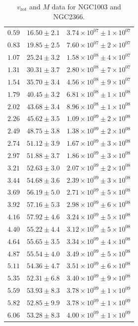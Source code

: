 \documentclass{article}
\newcommand\vrot{\ensuremath{v_{\textrm{rot}}}}
\begin{document}
\begin{table}[h!]
\begin{tabular}{|c|c|c|}
        $0.59$ & $16.50 \pm 2.1$ & $3.74\times 10^{07} \pm 1\times 10^{07}$ \\
        $0.83$ & $19.85 \pm 2.5$ & $7.60\times 10^{07} \pm 2\times 10^{07}$ \\
        $1.07$ & $25.24 \pm 3.2$ & $1.58\times 10^{08} \pm 4\times 10^{07}$ \\
        $1.31$ & $30.31 \pm 3.7$ & $2.80\times 10^{08} \pm 7\times 10^{07}$ \\
        $1.54$ & $35.70 \pm 3.4$ & $4.56\times 10^{08} \pm 9\times 10^{07}$ \\
        $1.79$ & $40.45 \pm 3.2$ & $6.81\times 10^{08} \pm 1\times 10^{08}$ \\
        $2.02$ & $43.68 \pm 3.4$ & $8.96\times 10^{08} \pm 1\times 10^{08}$ \\
        $2.26$ & $45.62 \pm 3.5$ & $1.09\times 10^{09} \pm 2\times 10^{08}$ \\
        $2.49$ & $48.75 \pm 3.8$ & $1.38\times 10^{09} \pm 2\times 10^{08}$ \\
        $2.74$ & $51.12 \pm 3.9$ & $1.67\times 10^{09} \pm 3\times 10^{08}$ \\
        $2.97$ & $51.88 \pm 3.7$ & $1.86\times 10^{09} \pm 3\times 10^{08}$ \\
        $3.21$ & $52.63 \pm 3.0$ & $2.07\times 10^{09} \pm 2\times 10^{08}$ \\
        $3.44$ & $54.68 \pm 3.6$ & $2.39\times 10^{09} \pm 3\times 10^{08}$ \\
        $3.69$ & $56.19 \pm 5.0$ & $2.71\times 10^{09} \pm 5\times 10^{08}$ \\
        $3.92$ & $57.16 \pm 5.3$ & $2.98\times 10^{09} \pm 6\times 10^{08}$ \\
        $4.16$ & $57.92 \pm 4.6$ & $3.24\times 10^{09} \pm 5\times 10^{08}$ \\
        $4.40$ & $55.22 \pm 4.4$ & $3.12\times 10^{09} \pm 5\times 10^{08}$ \\
        $4.64$ & $55.65 \pm 3.5$ & $3.34\times 10^{09} \pm 4\times 10^{08}$ \\
        $4.87$ & $55.54 \pm 4.0$ & $3.49\times 10^{09} \pm 5\times 10^{08}$ \\
        $5.11$ & $54.36 \pm 4.7$ & $3.51\times 10^{09} \pm 6\times 10^{08}$ \\
        $5.35$ & $52.31 \pm 6.8$ & $3.40\times 10^{09} \pm 9\times 10^{08}$ \\
        $5.59$ & $53.93 \pm 8.3$ & $3.78\times 10^{09} \pm 1\times 10^{09}$ \\
        $5.82$ & $52.85 \pm 9.9$ & $3.78\times 10^{09} \pm 1\times 10^{09}$ \\
        $6.06$ & $53.28 \pm 8.3$ & $4.00\times 10^{09} \pm 1\times 10^{09}$ \\
        \hline
    \end{tabular}
    \caption{$\vrot$ and $M$ data for NGC1003 and NGC2366.}
    \label{tab:proc1003,2366}
\end{table}
\end{document}
